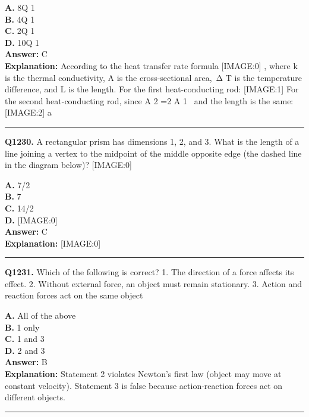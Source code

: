 \documentclass[12pt]{article}
\begin{document}
\textbf{A.} 8Q
1 \\
\textbf{B.} 4Q
1 \\
\textbf{C.} 2Q
1 \\
\textbf{D.} 10Q
1 \\

\textbf{Answer:} C \\
\textbf{Explanation:} According to the heat transfer rate formula
[IMAGE:0]
, where
k
is the thermal conductivity,
A
is the cross-sectional area, Δ
T
is the temperature difference, and
L
is the length.
For the first heat-conducting rod:
[IMAGE:1]
For the second heat-conducting rod, since
A
2
​=2
A
1
​ and the length is the same:
[IMAGE:2]
a

\hrule
\vspace{1em}


\noindent
\textbf{Q1230.} A rectangular prism has dimensions 1, 2, and 3. What is the length of a line joining a vertex to the midpoint of the middle opposite edge (the dashed line in the diagram below)?
[IMAGE:0]



\textbf{A.} \sqrt{}7/2 \\
\textbf{B.} \sqrt{}7 \\
\textbf{C.} \sqrt{}14/2 \\
\textbf{D.} [IMAGE:0] \\

\textbf{Answer:} C \\
\textbf{Explanation:} [IMAGE:0]

\hrule
\vspace{1em}


\noindent
\textbf{Q1231.} Which of the following is correct?
1.
The direction of a force affects its effect.
2.
Without external force, an object must remain stationary.
3.
Action and reaction forces act on the same object



\textbf{A.} All of the above \\
\textbf{B.} 1 only \\
\textbf{C.} 1 and 3 \\
\textbf{D.} 2 and 3 \\

\textbf{Answer:} B \\
\textbf{Explanation:} Statement 2 violates Newton’s first law (object may move at constant velocity). Statement 3 is false because action-reaction forces act on different objects.

\hrule
\vspace{1em}
\end{document}
